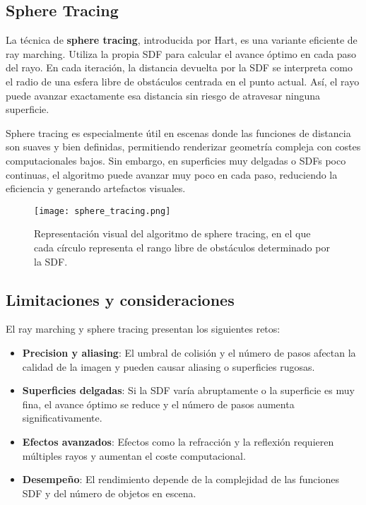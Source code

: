 \subsection{Sphere Tracing}

La técnica de \textbf{sphere tracing}, introducida por Hart, es una variante
eficiente de ray marching. Utiliza la propia SDF para calcular el avance óptimo
en cada paso del rayo. En cada iteración, la distancia devuelta por la SDF se
interpreta como el radio de una esfera libre de obstáculos centrada en el punto
actual. Así, el rayo puede avanzar exactamente esa distancia sin riesgo de
atravesar ninguna superficie.

Sphere tracing es especialmente útil en escenas donde las funciones de
distancia son suaves y bien definidas, permitiendo renderizar geometría
compleja con costes computacionales bajos. Sin embargo, en superficies muy
delgadas o SDFs poco continuas, el algoritmo puede avanzar muy poco en cada
paso, reduciendo la eficiencia y generando artefactos
visuales.

\begin{figure}[H]
    \centering
    \texttt{[image: sphere\_tracing.png]}
    \caption{Representación visual del algoritmo de sphere tracing, en el que cada círculo representa el rango libre de obstáculos determinado por la SDF.}
    \label{fig:sphere-tracing}
\end{figure}

\subsection{Limitaciones y consideraciones}

El ray marching y sphere tracing presentan los siguientes retos:

\begin{itemize}
    \item \textbf{Precision y aliasing}: El umbral de colisión y el número de pasos afectan la calidad de la imagen y pueden causar aliasing o superficies rugosas.
    \item \textbf{Superficies delgadas}: Si la SDF varía abruptamente o la superficie es muy fina, el avance óptimo se reduce y el número de pasos aumenta significativamente.
    \item \textbf{Efectos avanzados}: Efectos como la refracción y la reflexión requieren múltiples rayos y aumentan el coste computacional.
    \item \textbf{Desempeño}: El rendimiento depende de la complejidad de las funciones SDF y del número de objetos en escena.
\end{itemize}

